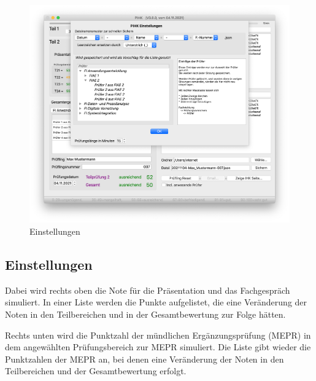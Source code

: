 \documentclass[a4paper,notitlepage,parskip=half]{scrartcl}
\begin{document}
\begin{figure}[ht]
  \centering
  \includegraphics[width=\textwidth]{Einstellungen.png}
  \caption{Einstellungen}
  \label{fig:einstellungen}
\end{figure}

\subsection{Einstellungen}

Dabei wird rechts oben die Note für die Präsentation und das Fachgespräch simuliert. In einer Liste werden die Punkte aufgelistet, die eine Veränderung der Noten in den Teilbereichen und in der Gesamtbewertung zur Folge hätten.

Rechts unten wird die Punktzahl der mündlichen Ergänzungsprüfung (MEPR) in dem angewählten Prüfungsbereich zur MEPR simuliert. Die Liste gibt wieder die Punktzahlen der MEPR an, bei denen eine Veränderung der Noten in den Teilbereichen und der Gesamtbewertung erfolgt. 


\end{document}
